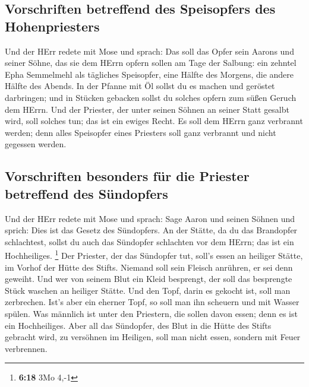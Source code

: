 \hypertarget{vorschriften-betreffend-des-speisopfers-des-hohenpriesters}{%
\subsection{Vorschriften betreffend des Speisopfers des
Hohenpriesters}\label{vorschriften-betreffend-des-speisopfers-des-hohenpriesters}}

 Und der HErr redete mit Mose und sprach: 
Das soll das Opfer sein Aarons und seiner Söhne, das sie dem HErrn
opfern sollen am Tage der Salbung: ein zehntel Epha Semmelmehl als
tägliches Speisopfer, eine Hälfte des Morgens, die andere Hälfte des
Abends.  In der Pfanne mit Öl sollst du es machen und
geröstet darbringen; und in Stücken gebacken sollst du solches opfern
zum süßen Geruch dem HErrn.  Und der Priester, der unter
seinen Söhnen an seiner Statt gesalbt wird, soll solches tun; das ist
ein ewiges Recht. Es soll dem HErrn ganz verbrannt werden;
 denn alles Speisopfer eines Priesters soll ganz
verbrannt und nicht gegessen werden.

\hypertarget{vorschriften-besonders-fuxfcr-die-priester-betreffend-des-suxfcndopfers}{%
\subsection{Vorschriften besonders für die Priester betreffend des
Sündopfers}\label{vorschriften-besonders-fuxfcr-die-priester-betreffend-des-suxfcndopfers}}

 Und der HErr redete mit Mose und sprach: 
Sage Aaron und seinen Söhnen und sprich: Dies ist das Gesetz des
Sündopfers. An der Stätte, da du das Brandopfer schlachtest, sollst du
auch das Sündopfer schlachten vor dem HErrn; das ist ein Hochheiliges.
\footnote{\textbf{6:18} 3Mo 4,-1}  Der Priester, der das
Sündopfer tut, soll's essen an heiliger Stätte, im Vorhof der Hütte des
Stifts.  Niemand soll sein Fleisch anrühren, er sei denn
geweiht. Und wer von seinem Blut ein Kleid besprengt, der soll das
besprengte Stück waschen an heiliger Stätte.  Und den
Topf, darin es gekocht ist, soll man zerbrechen. Ist's aber ein eherner
Topf, so soll man ihn scheuern und mit Wasser spülen. 
Was männlich ist unter den Priestern, die sollen davon essen; denn es
ist ein Hochheiliges.  Aber all das Sündopfer, des Blut
in die Hütte des Stifts gebracht wird, zu versöhnen im Heiligen, soll
man nicht essen, sondern mit Feuer verbrennen.

